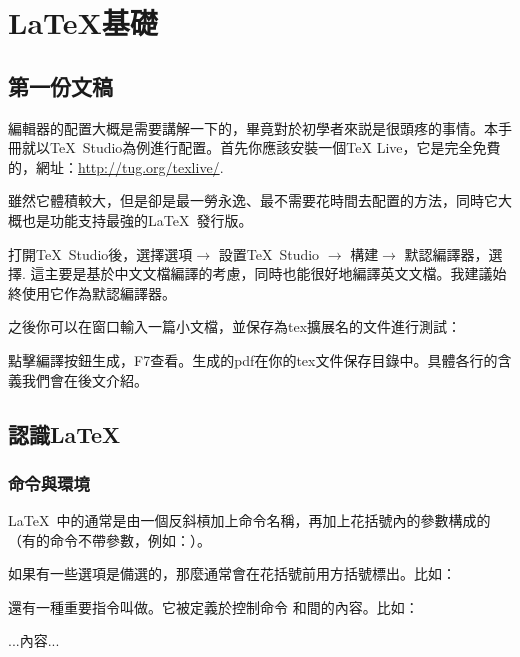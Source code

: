 \chapter{\LaTeX{}基礎}
\section{第一份文稿}

編輯器的配置大概是需要講解一下的，畢竟對於初學者來説是很頭疼的事情。本手冊就以\TeX\ Studio為例進行配置。首先你應該安裝一個\TeX{} Live，它是完全免費的，網址：\url{http://tug.org/texlive/}.

雖然它體積較大，但是卻是最一勞永逸、最不需要花時間去配置的方法，同時它大概也是功能支持最強的\LaTeX\ 發行版。

打開\TeX\ Studio後，選擇選項$\rightarrow$ 設置\TeX\ Studio $\rightarrow$ 構建$\rightarrow$ 默認編譯器，選擇\xelatex{}. 這主要是基於中文文檔編譯的考慮，同時\xelatex 也能很好地編譯英文文檔。我建議始終使用它作為默認編譯器。\dpar

之後你可以在窗口輸入一篇小文檔，並保存為tex擴展名的文件進行測試：

點擊編譯按鈕生成，F7查看。生成的pdf在你的tex文件保存目錄中。具體各行的含義我們會在後文介紹。

\section{認識\LaTeX}
\subsection{命令與環境}
\LaTeX\ 中的通常是由一個反斜槓加上命令名稱，再加上花括號內的參數構成的（有的命令不帶參數，例如：）。

如果有一些選項是備選的，那麼通常會在花括號前用方括號標出。比如：

還有一種重要指令叫做。它被定義於控制命令 和間的內容。比如：
\begin{latex}

...內容...

\end{latex}

